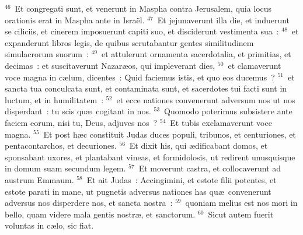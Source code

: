 ${}^{46}$~Et congregati sunt, et venerunt in Maspha contra Jerusalem, quia locus orationis erat in Maspha ante in Isra\"el.
${}^{47}$~Et jejunaverunt illa die, et induerunt se ciliciis, et cinerem imposuerunt capiti suo, et disciderunt vestimenta sua~:
${}^{48}$~et expanderunt libros legis, de quibus scrutabantur gentes similitudinem simulacrorum suorum~:
${}^{49}$~et attulerunt ornamenta sacerdotalia, et primitias, et decimas~: et suscitaverunt Nazar\ae os, qui impleverant dies,
${}^{50}$~et clamaverunt voce magna in c\ae lum, dicentes~: Quid faciemus istis, et quo eos ducemus~?
${}^{51}$~et sancta tua conculcata sunt, et contaminata sunt, et sacerdotes tui facti sunt in luctum, et in humilitatem~:
${}^{52}$~et ecce nationes convenerunt adversum nos ut nos disperdant~: tu scis qu\ae\ cogitant in nos.
${}^{53}$~Quomodo poterimus subsistere ante faciem eorum, nisi tu, Deus, adjuves nos~?
${}^{54}$~Et tubis exclamaverunt voce magna.
${}^{55}$~Et post h\ae c constituit Judas duces populi, tribunos, et centuriones, et pentacontarchos, et decuriones.
${}^{56}$~Et dixit his, qui \ae dificabant domos, et sponsabant uxores, et plantabant vineas, et formidolosis, ut redirent unusquisque in domum suam secundum legem.
${}^{57}$~Et moverunt castra, et collocaverunt ad austrum Emmaum.
${}^{58}$~Et ait Judas~: Accingimini, et estote filii potentes, et estote parati in mane, ut pugnetis adversus nationes has qu\ae\ convenerunt adversus nos disperdere nos, et sancta nostra~:
${}^{59}$~quoniam melius est nos mori in bello, quam videre mala gentis nostr\ae , et sanctorum.
${}^{60}$~Sicut autem fuerit voluntas in c\ae lo, sic fiat.

